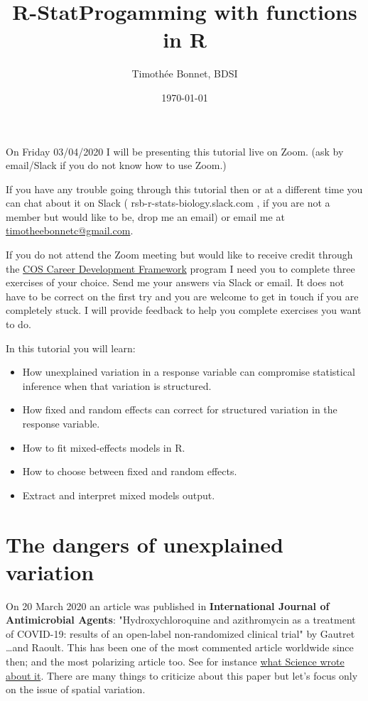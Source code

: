 \documentclass[12pt,a4paper]{scrartcl}\usepackage[]{graphicx}\usepackage[]{color}
\title{R-StatProgamming with functions in R}
\date{\today}
\author{Timoth\'ee Bonnet, BDSI}
\begin{document}
\maketitle

On Friday 03/04/2020 I will be presenting this tutorial live on Zoom. (ask by email/Slack if you do not know how to use Zoom.)

If you have any trouble going through this tutorial then or at a different time you can chat about it on Slack ( rsb-r-stats-biology.slack.com , if you are not a member but would like to be, drop me an email) or email me at \href{mailto:timotheebonnetc@gmail.com}{timotheebonnetc@gmail.com}.

If you do not attend the Zoom meeting but would like to receive credit through the \href{https://wattlecourses.anu.edu.au/enrol/index.php?id=23938}{COS Career Development Framework} program I need you to complete three exercises of your choice. Send me your answers via Slack or email. It does not have to be correct on the first try and you are welcome to get in touch if you are completely stuck. I will provide feedback to help you complete exercises you want to do.

In this tutorial you will learn:

\begin{itemize}
    \item How unexplained variation in a response variable can compromise statistical inference when that variation is structured.
    \item How fixed and random effects can correct for structured variation in the response variable.
    \item How to fit mixed-effects models in R.
    \item How to choose between fixed and random effects.
    \item Extract and interpret mixed models output.
\end{itemize}

\tableofcontents
\ListOfExerciseInToc
{}

\clearpage

\section{The dangers of unexplained variation}

On 20 March 2020 an article was published in \textbf{International Journal of Antimicrobial Agents}: "Hydroxychloroquine and azithromycin as a treatment of COVID-19: results of an open-label non-randomized clinical trial" by Gautret \dots and Raoult. This has been one of the most commented article worldwide since then; and the most polarizing article too. See for instance \href{https://www.sciencemag.org/news/2020/03/insane-many-scientists-lament-trump-s-embrace-risky-malaria-drugs-coronavirus}{what Science wrote about it}. There are many things to criticize about this paper but let's focus only on the issue of spatial variation.
\end{document}
